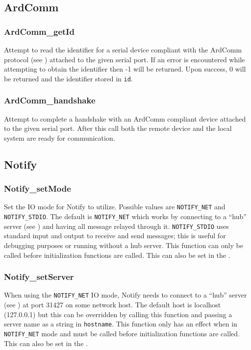 \subsection{ArdComm} \label{apiardcomm}
\subsubsection{ArdComm\_getId} \label{apiardcommgetid}
 Attempt to read the identifier
for a serial device compliant with the ArdComm protocol (see
) attached to the given
serial port. If an error is encountered while attempting to obtain the
identifier then -1 will be returned. Upon success, 0 will be returned and the
identifier stored in \texttt{id}.

\subsubsection{ArdComm\_handshake} \label{apiardcommhandshake}
 Attempt to complete a handshake
with an ArdComm compliant device attached to the given serial port. After this
call both the remote device and the local system are ready for communication.


\subsection{Notify} \label{apinotify}
\subsubsection{Notify\_setMode} \label{apinotifysetmode}
 Set the IO mode for Notify to
utilize. Possible values are \texttt{NOTIFY\_NET} and
\texttt{NOTIFY\_STDIO}. The default is \texttt{NOTIFY\_NET} which works by
connecting to a ``hub'' server (see ) and
having all message relayed through it. \texttt{NOTIFY\_STDIO} uses standard
input and output to receive and send messages; this is useful for debugging
purposes or running without a hub server. This function can only be called
before initialization functions are called. This can also be set in the
.

\subsubsection{Notify\_setServer} \label{apinotifysetserver}
 When using the \texttt{NOTIFY\_NET}
IO mode, Notify needs to connect to a ``hub'' server (see
) at port 31427 on some network host. The
default host is localhost (127.0.0.1) but this can be overridden by calling this
function and passing a server name as a string in \texttt{hostname}. This
function only has an effect when in \texttt{NOTIFY\_NET} mode and must be called
before initialization functions are called. This can also be set in the
.

